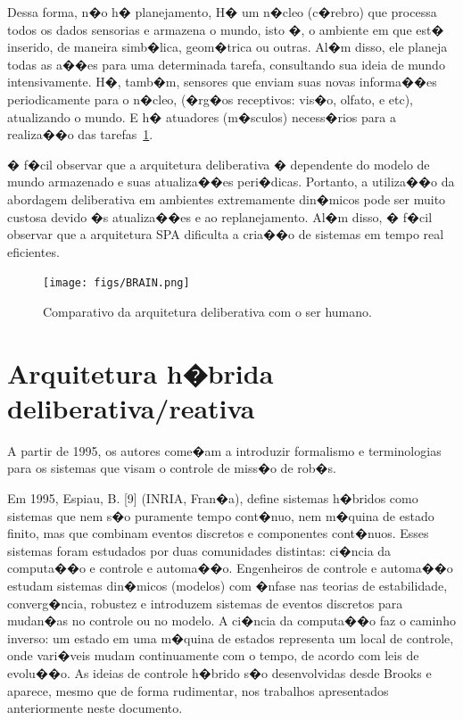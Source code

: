 Dessa forma, n�o h� planejamento,  H� um n�cleo (c�rebro) que processa todos os
dados sensorias e armazena o mundo, isto �, o ambiente em que est� inserido, de maneira simb�lica, geom�trica ou outras.
Al�m disso, ele planeja todas as a��es para uma determinada tarefa, consultando sua ideia de mundo intensivamente. H�,
tamb�m, sensores que enviam suas novas informa��es periodicamente para o n�cleo,
(�rg�os receptivos: vis�o, olfato, e etc), atualizando o mundo. E h�
atuadores (m�sculos) necess�rios para a realiza��o das tarefas~\ref{brain}.

� f�cil observar que a arquitetura deliberativa � dependente do
modelo de mundo armazenado e suas atualiza��es peri�dicas. Portanto, a
utiliza��o da abordagem deliberativa em ambientes extremamente din�micos pode ser muito
custosa devido �s atualiza��es e ao replanejamento. Al�m disso, � f�cil observar
que a arquitetura SPA dificulta a cria��o de sistemas em tempo real eficientes.

\begin{figure}[H]
\centering
\texttt{[image: figs/BRAIN.png]}
\caption{Comparativo da arquitetura deliberativa com o ser humano.}
\label{brain}
\end{figure}


\section{Arquitetura h�brida deliberativa/reativa}



A partir de 1995, os autores come�am a introduzir formalismo e terminologias
para os sistemas que visam o controle de miss�o de rob�s. 

Em 1995, Espiau, B. [9] (INRIA, Fran�a), define sistemas h�bridos como sistemas
que nem s�o puramente tempo cont�nuo, nem m�quina de estado finito, mas que
combinam eventos discretos e componentes cont�nuos. Esses sistemas foram
estudados por duas comunidades distintas: ci�ncia da computa��o e controle e
automa��o. Engenheiros de controle e automa��o estudam sistemas din�micos
(modelos) com �nfase nas teorias de estabilidade, converg�ncia, robustez e
introduzem sistemas de eventos discretos para mudan�as no controle ou no modelo.
A ci�ncia da computa��o faz o caminho inverso: um estado em uma m�quina de
estados representa um local de controle, onde vari�veis mudam continuamente com
o tempo, de acordo com leis de evolu��o. As ideias de controle h�brido s�o
desenvolvidas desde Brooks e aparece, mesmo que de forma rudimentar, nos
trabalhos apresentados anteriormente neste documento. 

